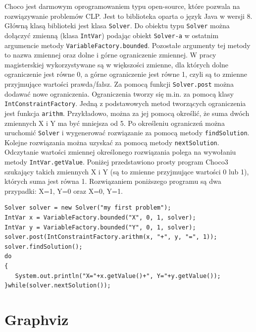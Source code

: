 Choco\cite{Choco3} jest darmowym oprogramowaniem typu open-source, które pozwala na rozwiązywanie problemów CLP. Jest to biblioteka oparta o język Java w wersji 8. Główną klasą biblioteki jest klasa \texttt{Solver}. 
Do obiektu typu \texttt{Solver} można dołączyć zmienną (klasa \texttt{IntVar}) podając obiekt \texttt{Solver-a} w ostatnim argumencie metody \texttt{VariableFactory.bounded}. Pozostałe argumenty tej metody to nazwa zmiennej oraz dolne i górne ograniczenie zmiennej. W pracy magisterskiej wykorzystywane są w większości zmienne, dla których dolne ograniczenie jest równe 0, a górne ograniczenie jest równe 1, czyli są to zmienne przyjmujące wartości prawda/fałsz. Za pomocą funkcji \texttt{Solver.post} można dodawać nowe ograniczenia. Ograniczenia tworzy się m.in. za pomocą klasy \texttt{IntConstraintFactory}. Jedną z podstawowych metod tworzących ograniczenia jest funkcja \texttt{arithm}. Przykładowo, można za jej pomocą określić, że suma dwóch zmiennych X i Y ma być mniejsza od 5. Po określeniu ograniczeń można uruchomić \texttt{Solver} i wygenerować rozwiązanie za pomocą metody \texttt{findSolution}. Kolejne rozwiązania można uzyskać za pomocą metody \texttt{nextSolution}. Odczytanie wartości zmiennej określonego rozwiązania polega na wywołaniu metody \texttt{IntVar.getValue}. 
Poniżej przedstawiono prosty program Choco3 szukający takich zmiennych X i Y (są to zmienne przyjmujące wartości 0 lub 1), których suma jest równa 1. Rozwiązaniem poniższego programu są dwa przypadki: X=1, Y=0 oraz X=0, Y=1.
\begin{verbatim}
Solver solver = new Solver("my first problem");
IntVar x = VariableFactory.bounded("X", 0, 1, solver);
IntVar y = VariableFactory.bounded("Y", 0, 1, solver);
solver.post(IntConstraintFactory.arithm(x, "+", y, "=", 1));
solver.findSolution();
do
{
   System.out.println("X="+x.getValue()+", Y="+y.getValue());
}while(solver.nextSolution());
\end{verbatim}


\section{Graphviz}

